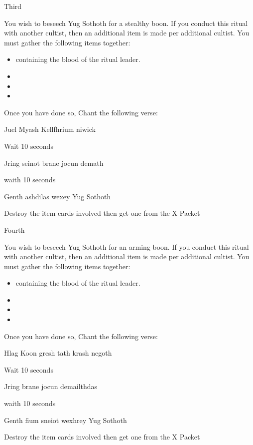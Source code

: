 \documentclass[greennotebook]{guildcamp4} %
\begin{document}
\begin{page}{Third}
	
		You wish to beseech Yug Sothoth for a stealthy boon. If you conduct this ritual with another cultist, then an additional item is made per additional cultist. You must gather the following items together: 
		
		\begin{itemize}
			\item \iTestTube{} containing the blood of the ritual leader.
			\item \iGlassLens{}
			\item \iCauldron{}
			\item \iChemicalV{}
		\end{itemize}		
		
		Once you have done so, Chant the following verse:
		
		Juel Myash Kellfhrium niwick
		
		Wait 10 seconds
		
		Jring seinot brane jocun demath
		
		waith 10 seconds
		
		Genth ashdilas wexey Yug Sothoth
		
		Destroy the item cards involved then get one \iInvisibilityCloak{} from the X Packet
	
\end{page}

\begin{page}{Fourth}
	
		You wish to beseech Yug Sothoth for an arming boon. If you conduct this ritual with another cultist, then an additional item is made per additional cultist. You must gather the following items together: 
		
		\begin{itemize}
			\item \iTestTube{} containing the blood of the ritual leader.
			\item \iMultitool{}
			\item \iScrapMetal{}
			\item \iWrench{}
		\end{itemize}		
		
		Once you have done so, Chant the following verse:
		
		Hlag Koon gresh tath krash negoth
		
		Wait 10 seconds
		
		Jring  brane jocun demailthdas
		
		waith 10 seconds
		
		Genth fium sneiot wexhrey Yug Sothoth
		
		Destroy the item cards involved then get one \iCRUpPotion{} from the X Packet

	
\end{page}
\end{document}
